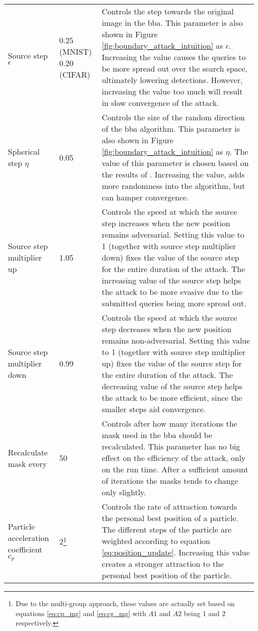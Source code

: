 \begin{longtable}{p{3cm}p{2.5cm}p{7cm}}
Source step $\epsilon$ &0.25 (MNIST) 0.20 (CIFAR) & Controls the step towards the original image in the \gls{bba}. This parameter is also shown in Figure \ref{fig:boundary_attack_intuition} as $\epsilon$. Increasing the value causes the queries to be more spread out over the search space, ultimately lowering detections. However, increasing the value too much will result in slow convergence of the attack.\\
Spherical step $\eta$	&0.05 & Controls the size of the random direction of the \gls{bba} algorithm. This parameter is also shown in Figure \ref{fig:boundary_attack_intuition} as $\eta$. The value of this parameter is chosen based on the results of \cite{brunner_guessing_2019}. Increasing the value, adds more randomness into the algorithm, but can hamper convergence.\\
Source step multiplier up &1.05	&Controls the speed at which the source step increases when the new position remains adversarial. Setting this value to 1 (together with source step multiplier down) fixes the value of the source step for the entire duration of the attack. The increasing value of the source step helps the attack to be more evasive due to the submitted queries being more spread out.\\
Source step multiplier down &0.99 &Controls the speed at which the source step decreases when the new position remains non-adversarial. Setting this value to 1 (together with source step multiplier up) fixes the value of the source step for the entire duration of the attack. The decreasing value of the source step helps the attack to be more efficient, since the smaller steps aid convergence.\\
Recalculate mask every &50	&Controls after how many iterations the mask used in the \gls{bba} should be recalculated. This parameter has no big effect on the efficiency of the attack, only on the run time. After a sufficient amount of iterations the masks tends to change only slightly.\\
Particle acceleration coefficient $c_p$ &2\footnote{\label{ftn:cp} Due to the multi-group approach, these values are actually set based on equations \ref{eq:cp_mg} and \ref{eq:cg_mg} with $A1$ and $A2$ being 1 and 2 respectively.} &Controls the rate of attraction towards the personal best position of a particle. The different steps of the particle are weighted according to equation \ref{eq:position_update}. Increasing this value creates a stronger attraction to the personal best position of the particle.\\

\end{longtable}
